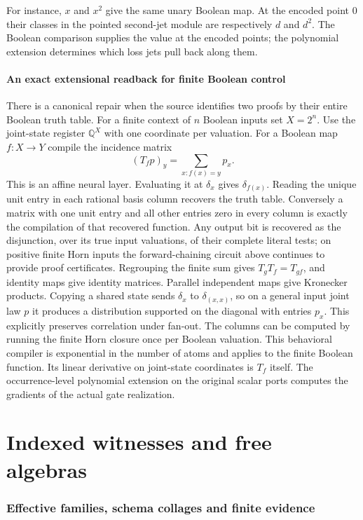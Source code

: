 \documentclass[11pt,a4paper]{article}
\theoremstyle{definition}
\theoremstyle{remark}\newaliascnt{remark}{theorem}
\newcommand{\Q}{\mathbb Q}
\numberwithin{equation}{section}
\begin{document}
For instance, $x$ and $x^2$ give the same unary Boolean map. At the encoded point $0$ their classes in the pointed second-jet module are respectively $d$ and $d^2$. The Boolean comparison supplies the value at the encoded points; the polynomial extension determines which loss jets pull back along them.

\subsection{An exact extensional readback for finite Boolean control}
There is a canonical repair when the source identifies two proofs by their entire Boolean truth table. For a finite context of $n$ Boolean inputs set $X=2^n$. Use the joint-state register $\Q^X$ with one coordinate per valuation. For a Boolean map $f:X\to Y$ compile the incidence matrix
\[
 (T_f p)_y=\sum_{x:f(x)=y}p_x.
\]
This is an affine neural layer. Evaluating it at $\delta_x$ gives $\delta_{f(x)}$. Reading the unique unit entry in each rational basis column recovers the truth table. Conversely a matrix with one unit entry and all other entries zero in every column is exactly the compilation of that recovered function. Any output bit is recovered as the disjunction, over its true input valuations, of their complete literal tests; on positive finite Horn inputs the forward-chaining circuit above continues to provide proof certificates. Regrouping the finite sum gives $T_gT_f=T_{gf}$, and identity maps give identity matrices. Parallel independent maps give Kronecker products. Copying a shared state sends $\delta_x$ to $\delta_{(x,x)}$, so on a general input joint law $p$ it produces a distribution supported on the diagonal with entries $p_x$. This explicitly preserves correlation under fan-out. The columns can be computed by running the finite Horn closure once per Boolean valuation. This behavioral compiler is exponential in the number of atoms and applies to the finite Boolean function. Its linear derivative on joint-state coordinates is $T_f$ itself. The occurrence-level polynomial extension on the original scalar ports computes the gradients of the actual gate realization.

\clearpage
\part{Indexed witnesses and free algebras}\label{part:algebras}

\section{Effective families, schema collages and finite evidence}\label{sec:eff}
\end{document}
